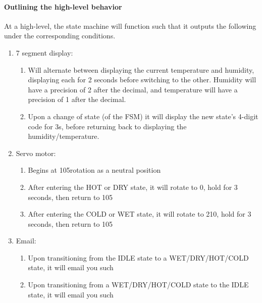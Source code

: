 \documentclass{article}
\begin{document}
    \paragraph{Outlining the high-level behavior}
    At a high-level, the state machine will function such that it outputs the following under the corresponding conditions.
    \begin{enumerate}
      \item 7 segment display:
        \begin{enumerate}
          \item Will alternate between displaying the current temperature and humidity, displaying each for 2 seconds before switching to the other. Humidity will have a precision of 2 after the decimal, and temperature will have a precision of 1 after the decimal.
          \item Upon a change of state (of the FSM) it will display the new state's 4-digit code for 3s, before returning back to displaying the humidity/temperature.
        \end{enumerate}
      \item Servo motor:
        \begin{enumerate}
          \item Begins at 105\degree rotation as a neutral position
          \item After entering the HOT or DRY state, it will rotate to 0\degree, hold for 3 seconds, then return to 105\degree
          \item After entering the COLD or WET state, it will rotate to 210\degree, hold for 3 seconds, then return to 105\degree
        \end{enumerate}
      \item Email:
        \begin{enumerate}
          \item Upon transitioning from the IDLE state to a WET/DRY/HOT/COLD state, it will email you such
          \item Upon transitioning from a WET/DRY/HOT/COLD state to the IDLE state, it will email you such
        \end{enumerate}
    \end{enumerate}
\end{document}
